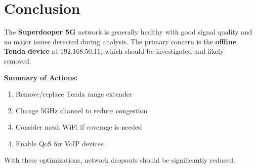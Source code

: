 \documentclass[11pt,letterpaper]{article}
\begin{document}
\section{Conclusion}

The \textbf{Superdooper 5G} network is generally healthy with good signal quality and no major issues detected during analysis. The primary concern is the \textbf{offline Tenda device} at 192.168.50.11, which should be investigated and likely removed.

\textbf{Summary of Actions:}
\begin{enumerate}
    \item Remove/replace Tenda range extender
    \item Change 5GHz channel to reduce congestion
    \item Consider mesh WiFi if coverage is needed
    \item Enable QoS for VoIP devices
\end{enumerate}

With these optimizations, network dropouts should be significantly reduced.
\end{document}
